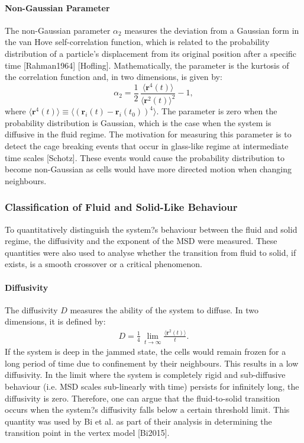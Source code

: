 \documentclass[a4paper,12pt]{article}
\begin{document}
\paragraph{Non-Gaussian Parameter}
The non-Gaussian parameter $\alpha_2$ measures the deviation from a Gaussian form in the van Hove self-correlation function, which is related to the probability distribution of a particle's displacement from its original position after a specific time [Rahman1964] [Hofling]. Mathematically, the parameter is the kurtosis of the correlation function and, in two dimensions, is given by:
\begin{equation}
\alpha_2 = \frac{1}{2}\,\frac{\langle{\bm{r}^4(t)\rangle}}{\langle{\bm{r}^2(t)\rangle}^2} - 1,
\end{equation}
where $\langle{\bm{r}^4(t)\rangle} \equiv \langle{\left(\bm{r}_i(t) - \bm{r}_i(t_0)\right)^4\rangle}$. The parameter is zero when the probability distribution is Gaussian, which is the case when the system is diffusive in the fluid regime. The motivation for measuring this parameter is to detect the cage breaking events that occur in glass-like regime at intermediate time scales [Schotz]. These events would cause the probability distribution to become non-Gaussian as cells would have more directed motion when changing neighbours.

\subsubsection{Classification of Fluid and Solid-Like Behaviour}
To quantitatively distinguish the system?s behaviour between the fluid and solid regime, the diffusivity and the exponent of the MSD were measured. These quantities were also used to analyse whether the transition from fluid to solid, if exists, is a smooth crossover or a critical phenomenon. 

\paragraph{Diffusivity}
The diffusivity $D$ measures the ability of the system to diffuse. In two dimensions, it is defined by:
 \begin{eqnarray}
D = \frac{1}{4}\, \lim_{t \rightarrow \infty} \frac{\langle{\bm{r}^2(t)\rangle}}{t}.
\end{eqnarray}
If the system is deep in the jammed state, the cells would remain frozen for a long period of time due to confinement by their neighbours. This results in a low diffusivity. In the limit where the system is completely rigid and sub-diffusive behaviour (i.e. MSD scales sub-linearly with time) persists for infinitely long, the diffusivity is zero. Therefore, one can argue that the fluid-to-solid transition occurs when the system?s diffusivity falls below a certain threshold limit. This quantity was used by Bi et al. as part of their analysis in determining the transition point in the vertex model [Bi2015].
\end{document}
